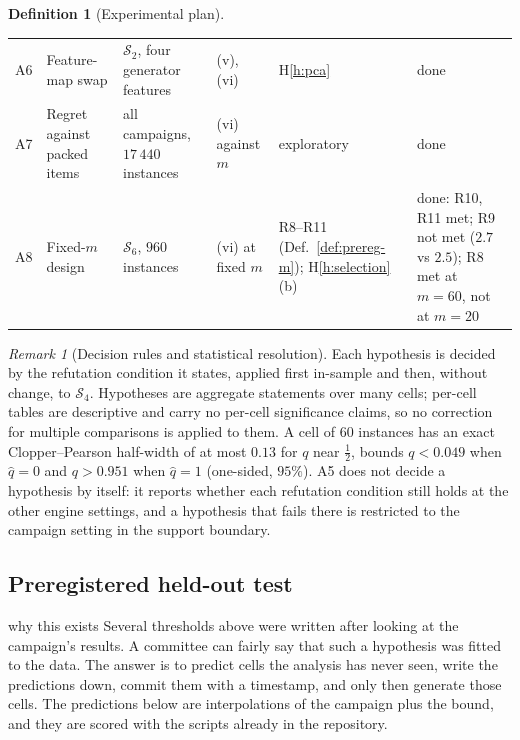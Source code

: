 \documentclass[a4paper,11pt]{article}
\theoremstyle{plain}
\theoremstyle{definition}
\newtheorem{definition}{Definition}
\theoremstyle{remark}
\newtheorem{remark}{Remark}
\begin{document}
\begin{definition}[Experimental plan]
\begin{center}
\begin{tabular}{@{}llp{3.1cm}p{2.6cm}p{2.0cm}p{2.2cm}@{}}
A6 & Feature-map swap & $\mathcal S_2$, four generator features & (v), (vi) & H\ref{h:pca} & done \\
A7 & Regret against packed items & all campaigns, $17\,440$ instances & (vi) against $m$ & exploratory & done \\
A8 & Fixed-$m$ design & $\mathcal S_6$, $960$ instances & (vi) at fixed $m$ & R8--R11 (Def.~\ref{def:prereg-m}); H\ref{h:selection}(b) & done: R10, R11 met; R9 not met ($2.7$ vs $2.5$); R8 met at $m=60$, not at $m=20$ \\
\bottomrule
\end{tabular}
\end{center}
\end{definition}

\begin{remark}[Decision rules and statistical resolution]
Each hypothesis is decided by the refutation condition it states, applied first in-sample and
then, without change, to $\mathcal S_4$. Hypotheses are aggregate statements over many cells;
per-cell tables are descriptive and carry no per-cell significance claims, so no correction
for multiple comparisons is applied to them. A cell of $60$ instances has an exact
Clopper--Pearson half-width of at most $0.13$ for $q$ near $\tfrac12$, bounds $q<0.049$ when
$\hat q=0$ and $q>0.951$ when $\hat q=1$ (one-sided, $95\%$). A5 does not decide a hypothesis
by itself: it reports whether each refutation condition still holds at the other engine
settings, and a hypothesis that fails there is restricted to the campaign setting in the
support boundary.
\end{remark}

\subsection{Preregistered held-out test}\label{sec:prereg}

\begin{plain}{why this exists}
Several thresholds above were written after looking at the campaign's results. A committee
can fairly say that such a hypothesis was fitted to the data. The answer is to predict cells
the analysis has never seen, write the predictions down, commit them with a timestamp, and
only then generate those cells. The predictions below are interpolations of the campaign plus
the bound, and they are scored with the scripts already in the repository.
\end{plain}
\end{document}
